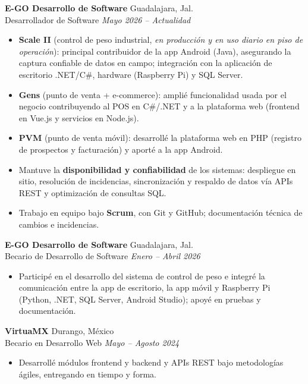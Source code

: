 \documentclass[11pt,a4paper]{article}
\newcommand{\entry}[4]{%
  \textbf{#1} \hfill {\color{muted}#2}\\[1pt]
  {\color{accent}#3} \hfill {\color{muted}\itshape #4}\\[3pt]
}
\begin{document}
\entry{E-GO Desarrollo de Software}{Guadalajara, Jal.}{Desarrollador de Software}{Mayo 2026 -- Actualidad}
\begin{itemize}
  \item \textbf{Scale II} (control de peso industrial, \textit{en producción y en uso diario en piso de operación}):
        principal contribuidor de la app Android (Java), asegurando la captura confiable de datos en campo; integración
        con la aplicación de escritorio .NET/C\#, hardware (Raspberry Pi) y SQL Server.
  \item \textbf{Gens} (punto de venta + e-commerce): amplié funcionalidad usada por el negocio contribuyendo al POS en
        C\#/.NET y a la plataforma web (frontend en Vue.js y servicios en Node.js).
  \item \textbf{PVM} (punto de venta móvil): desarrollé la plataforma web en PHP (registro de prospectos y facturación)
        y aporté a la app Android.
  \item Mantuve la \textbf{disponibilidad y confiabilidad} de los sistemas: despliegue en sitio, resolución de
        incidencias, sincronización y respaldo de datos vía APIs REST y optimización de consultas SQL.
  \item Trabajo en equipo bajo \textbf{Scrum}, con Git y GitHub; documentación técnica de cambios e incidencias.
\end{itemize}

\entry{E-GO Desarrollo de Software}{Guadalajara, Jal.}{Becario de Desarrollo de Software}{Enero -- Abril 2026}
\begin{itemize}
  \item Participé en el desarrollo del sistema de control de peso e integré la comunicación entre la app de escritorio,
        la app móvil y Raspberry Pi (Python, .NET, SQL Server, Android Studio); apoyé en pruebas y documentación.
\end{itemize}

\entry{VirtuaMX}{Durango, México}{Becario en Desarrollo Web}{Mayo -- Agosto 2024}
\begin{itemize}
  \item Desarrollé módulos frontend y backend y APIs REST bajo metodologías ágiles, entregando en tiempo y forma.
\end{itemize}

\end{document}
